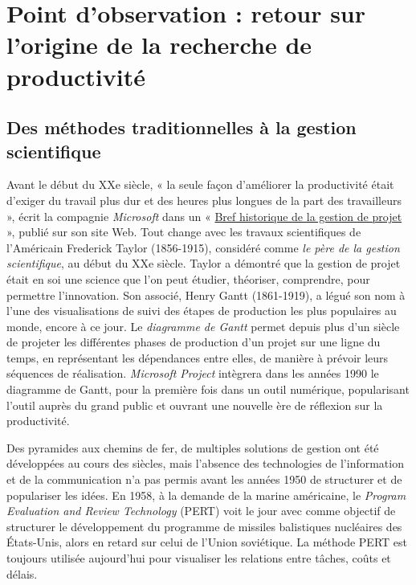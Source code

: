 \documentclass[
  letterpaper,
  DIV=11,
  numbers=noendperiod,
  oneside]{scrreprt}
\begin{document}
\hypertarget{point-dobservation-retour-sur-lorigine-de-la-recherche-de-productivituxe9}{%
\section{Point d'observation : retour sur l'origine de la recherche de
productivité}\label{point-dobservation-retour-sur-lorigine-de-la-recherche-de-productivituxe9}}

\hypertarget{des-muxe9thodes-traditionnelles-uxe0-la-gestion-scientifique}{%
\subsection{Des méthodes traditionnelles à la gestion
scientifique}\label{des-muxe9thodes-traditionnelles-uxe0-la-gestion-scientifique}}

Avant le début du XXe siècle, « la seule façon d'améliorer la
productivité était d'exiger du travail plus dur et des heures plus
longues de la part des travailleurs », écrit la compagnie
\emph{Microsoft} dans un «
\href{https://support.microsoft.com/fr-fr/topic/bref-historique-de-la-gestion-de-projet-a2e0b717-094b-4d1e-878a-fcd0978891cd}{Bref
historique de la gestion de projet} », publié sur son site Web. Tout
change avec les travaux scientifiques de l'Américain Frederick Taylor
(1856-1915), considéré comme \emph{le père de la gestion scientifique},
au début du XXe siècle. Taylor a démontré que la gestion de projet était
en soi une science que l'on peut étudier, théoriser, comprendre, pour
permettre l'innovation. Son associé, Henry Gantt (1861-1919), a légué
son nom à l'une des visualisations de suivi des étapes de production les
plus populaires au monde, encore à ce jour. Le \emph{diagramme de Gantt}
permet depuis plus d'un siècle de projeter les différentes phases de
production d'un projet sur une ligne du temps, en représentant les
dépendances entre elles, de manière à prévoir leurs séquences de
réalisation. \emph{Microsoft Project} intègrera dans les années 1990 le
diagramme de Gantt, pour la première fois dans un outil numérique,
popularisant l'outil auprès du grand public et ouvrant une nouvelle ère
de réflexion sur la productivité.

Des pyramides aux chemins de fer, de multiples solutions de gestion ont
été développées au cours des siècles, mais l'absence des technologies de
l'information et de la communication n'a pas permis avant les années
1950 de structurer et de populariser les idées. En 1958, à la demande de
la marine américaine, le \emph{Program Evaluation and Review Technology}
(PERT) voit le jour avec comme objectif de structurer le développement
du programme de missiles balistiques nucléaires des États-Unis, alors en
retard sur celui de l'Union soviétique. La méthode PERT est toujours
utilisée aujourd'hui pour visualiser les relations entre tâches, coûts
et délais.
\end{document}
